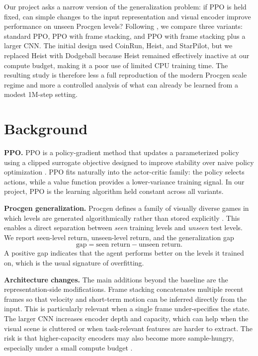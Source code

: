\documentclass[10pt,twocolumn]{article}
\begin{document}
Our project asks a narrow version of the generalization problem: if PPO is held fixed, can simple changes to the input representation and visual encoder improve performance on unseen Procgen levels? Following \citet{jesson2024procgen}, we compare three variants: standard PPO, PPO with frame stacking, and PPO with frame stacking plus a larger CNN. The initial design used CoinRun, Heist, and StarPilot, but we replaced Heist with Dodgeball because Heist remained effectively inactive at our compute budget, making it a poor use of limited CPU training time. The resulting study is therefore less a full reproduction of the modern Procgen scale regime and more a controlled analysis of what can already be learned from a modest 1M-step setting.

\section{Background}
\textbf{PPO.} PPO is a policy-gradient method that updates a parameterized policy using a clipped surrogate objective designed to improve stability over naive policy optimization \citep{schulman2017ppo}. PPO fits naturally into the actor-critic family: the policy selects actions, while a value function provides a lower-variance training signal. In our project, PPO is the learning algorithm held constant across all variants.

\textbf{Procgen generalization.} Procgen defines a family of visually diverse games in which levels are generated algorithmically rather than stored explicitly \citep{cobbe2020procgen}. This enables a direct separation between \emph{seen} training levels and \emph{unseen} test levels. We report seen-level return, unseen-level return, and the generalization gap
\[
\text{gap} = \text{seen return} - \text{unseen return}.
\]
A positive gap indicates that the agent performs better on the levels it trained on, which is the usual signature of overfitting.

\textbf{Architecture changes.} The main additions beyond the baseline are the representation-side modifications. Frame stacking concatenates multiple recent frames so that velocity and short-term motion can be inferred directly from the input. This is particularly relevant when a single frame under-specifies the state. The larger CNN increases encoder depth and capacity, which can help when the visual scene is cluttered or when task-relevant features are harder to extract. The risk is that higher-capacity encoders may also become more sample-hungry, especially under a small compute budget \citep{jesson2024procgen}.
\end{document}
